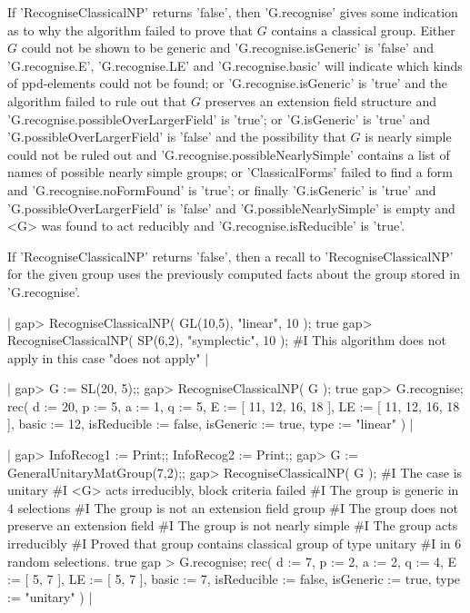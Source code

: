 If 'RecogniseClassicalNP' returns  'false', then 'G.recognise' gives some
indication as to why  the algorithm  failed to  prove that $G$ contains a
classical group.   Either  $G$ could  not  be  shown  to  be generic  and
'G.recognise.isGeneric' is 'false' and  'G.recognise.E', 'G.recognise.LE'
and 'G.recognise.basic' will indicate which  kinds  of ppd-elements could
not  be found; or  'G.recognise.isGeneric' is  'true'  and  the algorithm
failed to rule  out that $G$ preserves an  extension  field structure and
'G.recognise.possibleOverLargerField'  is  'true';  or  'G.isGeneric'  is
'true' and  'G.possibleOverLargerField' is  'false'  and the  possibility
that    $G$   is   nearly   simple   could   not   be   ruled   out   and
'G.recognise.possibleNearlySimple' contains a list  of names of  possible
nearly  simple groups; or 'ClassicalForms'  failed  to find  a  form  and
'G.recognise.noFormFound' is  'true'; or finally 'G.isGeneric' is  'true'
and  'G.possibleOverLargerField' is  'false' and 'G.possibleNearlySimple'
is empty and <G> was found to act reducibly and 'G.recognise.isReducible'
is 'true'.

If   'RecogniseClassicalNP'   returns   'false',   then   a   recall   to
'RecogniseClassicalNP' for  the given  group uses the previously computed
facts about the group stored in 'G.recognise'.


|    gap> RecogniseClassicalNP( GL(10,5), "linear", 10 );
    true
    gap> RecogniseClassicalNP( SP(6,2), "symplectic", 10 );
    #I This algorithm does not apply in this case
    "does not apply" |

|    gap> G := SL(20, 5);;
    gap> RecogniseClassicalNP( G );
     true
    gap> G.recognise;
     rec(
     d := 20,
     p := 5,
     a := 1,
     q := 5,
     E := [ 11, 12, 16, 18 ],
     LE := [ 11, 12, 16, 18 ],
     basic := 12,
     isReducible := false,
     isGeneric := true,
     type := "linear" ) |

|    gap> InfoRecog1 := Print;; InfoRecog2 := Print;;
    gap> G := GeneralUnitaryMatGroup(7,2);;
    gap> RecogniseClassicalNP( G );    
    #I  The case is unitary
    #I  <G> acts irreducibly, block criteria failed
    #I  The group is generic in 4 selections
    #I  The group is not an extension field group
    #I  The group does not preserve an extension field
    #I  The group is not nearly simple
    #I  The group acts irreducibly
    #I  Proved that group contains classical group of type unitary
    #I  in 6 random selections.
    true
    gap > G.recognise;
    rec(
    d := 7,
    p := 2,
    a := 2,
    q := 4,
    E := [ 5, 7 ],
    LE := [ 5, 7 ],
    basic := 7,
    isReducible := false,
    isGeneric := true,
    type := "unitary" ) |

